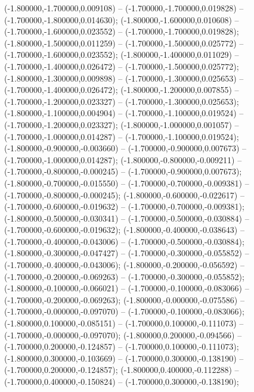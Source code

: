  (-1.800000,-1.700000,0.009108) -- (-1.700000,-1.700000,0.019828) -- (-1.700000,-1.800000,0.014630);
 (-1.800000,-1.600000,0.010608) -- (-1.700000,-1.600000,0.023552) -- (-1.700000,-1.700000,0.019828);
 (-1.800000,-1.500000,0.011259) -- (-1.700000,-1.500000,0.025772) -- (-1.700000,-1.600000,0.023552);
 (-1.800000,-1.400000,0.011029) -- (-1.700000,-1.400000,0.026472) -- (-1.700000,-1.500000,0.025772);
 (-1.800000,-1.300000,0.009898) -- (-1.700000,-1.300000,0.025653) -- (-1.700000,-1.400000,0.026472);
 (-1.800000,-1.200000,0.007855) -- (-1.700000,-1.200000,0.023327) -- (-1.700000,-1.300000,0.025653);
 (-1.800000,-1.100000,0.004904) -- (-1.700000,-1.100000,0.019524) -- (-1.700000,-1.200000,0.023327);
 (-1.800000,-1.000000,0.001057) -- (-1.700000,-1.000000,0.014287) -- (-1.700000,-1.100000,0.019524);
 (-1.800000,-0.900000,-0.003660) -- (-1.700000,-0.900000,0.007673) -- (-1.700000,-1.000000,0.014287);
 (-1.800000,-0.800000,-0.009211) -- (-1.700000,-0.800000,-0.000245) -- (-1.700000,-0.900000,0.007673);
 (-1.800000,-0.700000,-0.015550) -- (-1.700000,-0.700000,-0.009381) -- (-1.700000,-0.800000,-0.000245);
 (-1.800000,-0.600000,-0.022617) -- (-1.700000,-0.600000,-0.019632) -- (-1.700000,-0.700000,-0.009381);
 (-1.800000,-0.500000,-0.030341) -- (-1.700000,-0.500000,-0.030884) -- (-1.700000,-0.600000,-0.019632);
 (-1.800000,-0.400000,-0.038643) -- (-1.700000,-0.400000,-0.043006) -- (-1.700000,-0.500000,-0.030884);
 (-1.800000,-0.300000,-0.047427) -- (-1.700000,-0.300000,-0.055852) -- (-1.700000,-0.400000,-0.043006);
 (-1.800000,-0.200000,-0.056592) -- (-1.700000,-0.200000,-0.069263) -- (-1.700000,-0.300000,-0.055852);
 (-1.800000,-0.100000,-0.066021) -- (-1.700000,-0.100000,-0.083066) -- (-1.700000,-0.200000,-0.069263);
 (-1.800000,-0.000000,-0.075586) -- (-1.700000,-0.000000,-0.097070) -- (-1.700000,-0.100000,-0.083066);
 (-1.800000,0.100000,-0.085151) -- (-1.700000,0.100000,-0.111073) -- (-1.700000,-0.000000,-0.097070);
 (-1.800000,0.200000,-0.094566) -- (-1.700000,0.200000,-0.124857) -- (-1.700000,0.100000,-0.111073);
 (-1.800000,0.300000,-0.103669) -- (-1.700000,0.300000,-0.138190) -- (-1.700000,0.200000,-0.124857);
 (-1.800000,0.400000,-0.112288) -- (-1.700000,0.400000,-0.150824) -- (-1.700000,0.300000,-0.138190);
